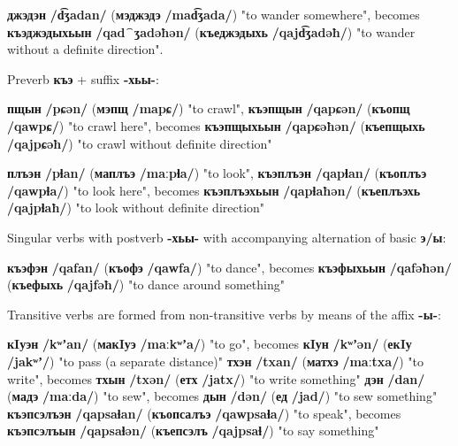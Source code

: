 \documentclass[a4paper,12pt]{book}
\newcommand{\1}[1]{\textbf{\emph{#1}}} %
\newcommand{\2}[1]{\textbf{[#1]}} %
\newcommand{\3}[1]{\fontsize{11pt}{0cm}\textbf{\emph{#1}}} %
\newcommand{\4}[1]{\fontsize{10pt}{0cm}\emph{#1}}	%
\newcommand{\5}[1]{\textbf{/#1/}} %
\newcommand{\6}[1]{\textbf{[#1]}} %
\newcommand{\7}[1]{\fontsize{12pt}{0cm}\emph{#1}} %
\newcommand{\8}[1]{\fontsize{12pt}{0cm}`#1'} %
\newcommand{\9}[1]{\fontsize{12pt}{0cm}(lit. `#1')} %
\newcommand{\glossphonemics}[1]{\textbf{/#1/}} %
\begin{document}
\begin{xlist}
\begin{xlist}
\ex \textbf{джэдэн} \glossphonemics{d͡ʒadan} (\textbf{мэджэдэ}  \glossphonemics{mad͡ʒada}) "to wander somewhere", becomes \textbf{къэджэдыхьын} \glossphonemics{qad⁀ʒadəħən} (\textbf{къеджэдыхь}  \glossphonemics{qajd͡ʒadəħ}) "to wander without a definite direction".
\end{xlist}
\ex Preverb \textbf{къэ} + suffix \textbf{-хьы-}: 
\begin{xlist}

\ex \textbf{пщын} \glossphonemics{pɕən} (\textbf{мэпщ} \glossphonemics{mapɕ}) "to crawl", \textbf{къэпщын} \glossphonemics{qapɕən} (\textbf{къопщ} \glossphonemics{qawpɕ}) "to crawl here", becomes \textbf{къэпщыхьын} \glossphonemics{qapɕəħən} (\textbf{къепщыхь} \glossphonemics{qajpɕəħ}) "to crawl without definite direction"

\ex \textbf{плъэн} \glossphonemics{pɬan} (\textbf{маплъэ} \glossphonemics{maːpɬa}) "to look", \textbf{къэплъэн} \glossphonemics{qapɬan} (\textbf{къоплъэ} \glossphonemics{qawpɬa}) "to look here", becomes \textbf{къэплъэхьын} \glossphonemics{qapɬaħən} (\textbf{къеплъэхь} \glossphonemics{qajpɬaħ}) "to look without definite direction"

\end{xlist}

\ex Singular verbs with postverb \textbf{-хьы-} with accompanying alternation of basic \textbf{э/ы}:
	\begin{xlist}
	\ex \textbf{къэфэн} \glossphonemics{qafan} (\textbf{къофэ} \glossphonemics{qawfa}) "to dance", becomes \textbf{къэфыхьын} \glossphonemics{qafəħən} (\textbf{къефыхь} \glossphonemics{qajfəħ}) "to dance around something"
	\end{xlist}

\ex Transitive verbs are formed from non-transitive verbs by means of the affix \textbf{-ы-}:
	\begin{xlist}
	\ex \textbf{кIуэн} \glossphonemics{kʷʼan} (\textbf{макIуэ} \glossphonemics{maːkʷʼa}) "to go", becomes \textbf{кIун} \glossphonemics{kʷʼən} (\textbf{екIу} \glossphonemics{jakʷʼ}) "to pass (a separate distance)"
	\ex \textbf{тхэн} \glossphonemics{txan} (\textbf{матхэ} \glossphonemics{maːtxa}) "to write", becomes \textbf{тхын} \glossphonemics{txən} (\textbf{етх} \glossphonemics{jatx}) "to write something"
	\ex \textbf{дэн} \glossphonemics{dan} (\textbf{мадэ} \glossphonemics{maːda}) "to sew", becomes \textbf{дын} \glossphonemics{dən} (\textbf{ед} \glossphonemics{jad}) "to sew something"
	\ex \textbf{къэпсэлъэн} \glossphonemics{qapsaɬan} (\textbf{къопсалъэ} \glossphonemics{qawpsaɬa}) "to speak", becomes \textbf{къэпсэлъын} \glossphonemics{qapsaɬən} (\textbf{къепсэлъ} \glossphonemics{qajpsaɬ}) "to say something"
	\end{xlist}
\end{xlist}
\end{document}
